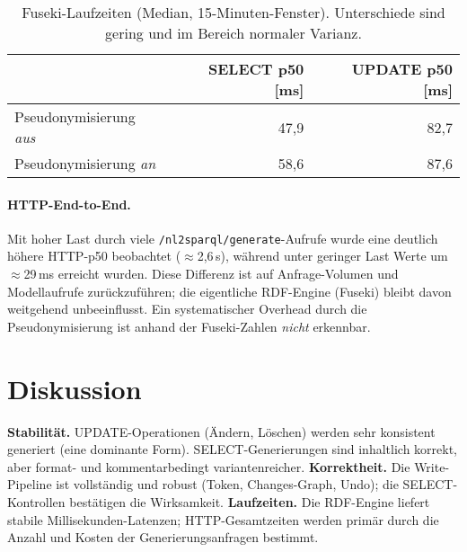 \begin{table}[h]
\centering
\begin{tabular}{lrr}
\toprule
 & \textbf{SELECT p50 [ms]} & \textbf{UPDATE p50 [ms]} \\
\midrule
Pseudonymisierung \emph{aus}  & 47{,}9 & 82{,}7 \\
Pseudonymisierung \emph{an}   & 58{,}6 & 87{,}6 \\
\bottomrule
\end{tabular}
\caption{Fuseki-Laufzeiten (Median, 15-Minuten-Fenster). Unterschiede sind gering und im Bereich normaler Varianz.}
\label{tab:perf-fuseki}
\end{table}

\paragraph{HTTP-End-to-End.}
Mit hoher Last durch viele \texttt{/nl2sparql/generate}-Aufrufe wurde eine deutlich höhere HTTP-p50 beobachtet (\(\approx\)2{,}6\,s), während unter geringer Last Werte um \(\approx\)29\,ms erreicht wurden. Diese Differenz ist auf Anfrage-Volumen und Modellaufrufe zurückzuführen; die eigentliche RDF-Engine (Fuseki) bleibt davon weitgehend unbeeinflusst. Ein systematischer Overhead durch die Pseudonymisierung ist anhand der Fuseki-Zahlen \emph{nicht} erkennbar.

\section{Diskussion}
\label{subsec:discussion}
\textbf{Stabilität.} UPDATE-Operationen (Ändern, Löschen) werden sehr konsistent generiert (eine dominante Form). SELECT-Generierungen sind inhaltlich korrekt, aber format- und kommentarbedingt variantenreicher. \textbf{Korrektheit.} Die Write-Pipeline ist vollständig und robust (Token, Changes-Graph, Undo); die SELECT-Kontrollen bestätigen die Wirksamkeit. \textbf{Laufzeiten.} Die RDF-Engine liefert stabile Millisekunden-Latenzen; HTTP-Gesamtzeiten werden primär durch die Anzahl und Kosten der Generierungsanfragen bestimmt.

